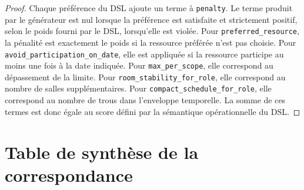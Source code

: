 \documentclass[12pt,a4paper]{article}
\begin{document}
\begin{proof}
Chaque préférence du DSL ajoute un terme à \texttt{penalty}. Le terme produit par le générateur est nul lorsque la préférence est satisfaite et strictement positif, selon le poids fourni par le DSL, lorsqu'elle est violée. Pour \texttt{preferred\_resource}, la pénalité est exactement le poids si la ressource préférée n'est pas choisie. Pour \texttt{avoid\_participation\_on\_date}, elle est appliquée si la ressource participe au moins une fois à la date indiquée. Pour \texttt{max\_per\_scope}, elle correspond au dépassement de la limite. Pour \texttt{room\_stability\_for\_role}, elle correspond au nombre de salles supplémentaires. Pour \texttt{compact\_schedule\_for\_role}, elle correspond au nombre de trous dans l'enveloppe temporelle. La somme de ces termes est donc égale au score défini par la sémantique opérationnelle du DSL.
\end{proof}

\section{Table de synthèse de la correspondance}
\end{document}
